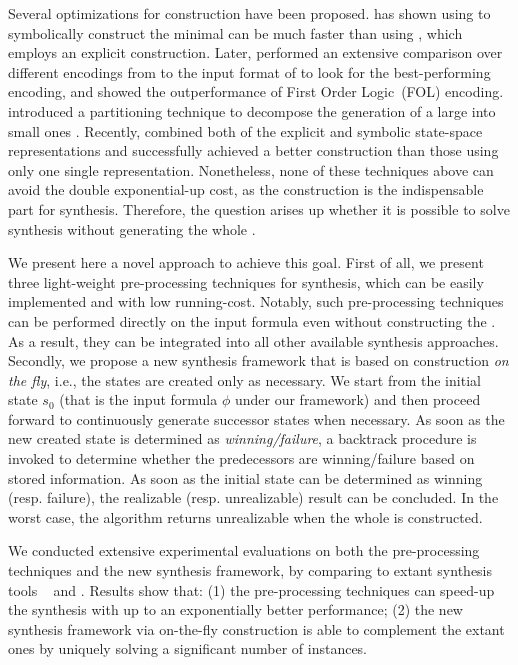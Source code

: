 Several optimizations for \dfa construction have been proposed. \citep{ZTLPV17} has shown using \mona \citep{HJJKPRS95,EKM98} to symbolically construct the minimal \dfa can be much faster than using \spot \citep{DP04}, which employs an explicit construction. Later, \citep{ZhuPV19} performed an extensive comparison over different encodings from \ltlf to the input format of \mona to look for the best-performing encoding, and showed the outperformance of First Order Logic~(FOL) encoding. \citep{TV19} introduced a partitioning technique to decompose the generation of a large \dfa into small ones \citep{MSL18}. Recently, \citep{BLTV20} combined both of the explicit and symbolic \dfa state-space representations and successfully achieved a better \dfa construction than those using only one single representation. Nonetheless, none of these techniques above can avoid the double exponential-up cost, as the \dfa construction is the indispensable part for \ltlf synthesis. Therefore, the question arises up whether it is possible to solve \ltlf synthesis without generating the whole \dfa.

We present here a novel approach to achieve this goal. First of all, we present three light-weight pre-processing techniques for \ltlf synthesis, which can be easily implemented and with low running-cost. Notably, such pre-processing techniques can be performed directly on the input formula even without constructing the \dfa. As a result, they can be integrated into all other available \ltlf synthesis approaches. Secondly, we propose a new synthesis framework that is based on \dfa construction \emph{on the fly}, i.e., the \dfa states are created only as necessary. We start from the initial state $s_0$ (that is the input formula $\phi$ under our framework) and then proceed forward to continuously generate successor states when necessary. As soon as the new created state is determined as \emph{winning/failure}, a backtrack procedure is invoked to determine whether the predecessors are winning/failure based on stored information. As soon as the initial state can be determined as winning (resp. failure), the realizable (resp. unrealizable) result can be concluded. In the worst case, the algorithm returns unrealizable when the whole \dfa is constructed. 

We conducted extensive experimental evaluations on both the pre-processing techniques and the new synthesis framework, by comparing to extant \ltlf synthesis tools \syft~\citep{ZTLPV17} and \lisasyft \citep{BLTV20}. Results show that: (1) the pre-processing techniques can speed-up the synthesis with up to an exponentially better performance; (2) the new synthesis framework via on-the-fly \dfa construction is able to complement the extant ones by uniquely solving a significant number of instances. 
